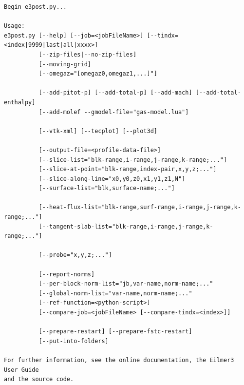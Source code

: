 \noindent
{\footnotesize
\begin{verbatim}
Begin e3post.py...

Usage:
e3post.py [--help] [--job=<jobFileName>] [--tindx=<index|9999|last|all|xxxx>]
          [--zip-files|--no-zip-files]
          [--moving-grid]
          [--omegaz="[omegaz0,omegaz1,...]"]

          [--add-pitot-p] [--add-total-p] [--add-mach] [--add-total-enthalpy]
          [--add-molef --gmodel-file="gas-model.lua"]

          [--vtk-xml] [--tecplot] [--plot3d]

          [--output-file=<profile-data-file>]
          [--slice-list="blk-range,i-range,j-range,k-range;..."]
          [--slice-at-point="blk-range,index-pair,x,y,z;..."]
          [--slice-along-line="x0,y0,z0,x1,y1,z1,N"]
          [--surface-list="blk,surface-name;..."]

          [--heat-flux-list="blk-range,surf-range,i-range,j-range,k-range;..."]
          [--tangent-slab-list="blk-range,i-range,j-range,k-range;..."]

          [--probe="x,y,z;..."]

          [--report-norms]
          [--per-block-norm-list="jb,var-name,norm-name;..."
          [--global-norm-list="var-name,norm-name;..."
          [--ref-function=<python-script>]
          [--compare-job=<jobFileName> [--compare-tindx=<index>]]

          [--prepare-restart] [--prepare-fstc-restart]
          [--put-into-folders]

For further information, see the online documentation, the Eilmer3 User Guide
and the source code.
\end{verbatim}
} %

